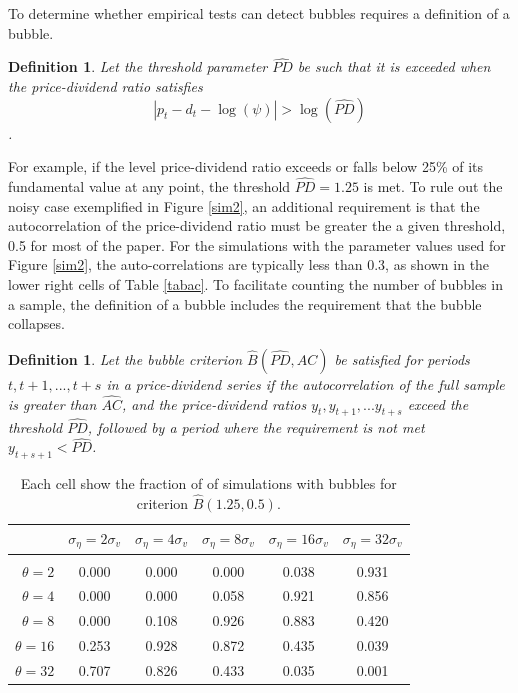 \documentclass[12pt]{article}
\newtheorem{definition}[theorem]{Definition}
\begin{document}
To determine whether empirical tests can detect bubbles requires a definition of a bubble. 
\begin{definition}
Let the threshold parameter $\widehat{PD}$ be such that it is exceeded when the price-dividend ratio satisfies
\begin{equation*}
 \left|p_{t}-d_{t}-\log(\psi)\right|>\log\left(\widehat{PD}\right)   
\end{equation*}.
\end{definition}
For example, if the level price-dividend ratio exceeds or falls below 25\% of its fundamental value at any point, the threshold $\widehat{PD}=1.25$ is met. 
To rule out the noisy case exemplified in Figure \ref{sim2}, an additional requirement is that the autocorrelation of the price-dividend ratio must be greater the a given threshold, 0.5 for most of the paper. For the simulations with the parameter values used for Figure \ref{sim2}, the auto-correlations are typically less than 0.3, as shown in the lower right cells of Table \ref{tabac}.
To facilitate counting the number of bubbles in a sample, the definition of a bubble includes the requirement that the bubble collapses.
\begin{definition}
    Let the bubble criterion $\widehat{B}\left(\widehat{PD},\widehat{AC}\right)$ be satisfied for periods $t,t+1,...,t+s$ in a price-dividend series if the autocorrelation of the full sample is greater than $\widehat{AC}$, and the price-dividend ratios $y_{t},y_{t+1},...y_{t+s}$ exceed the threshold $\widehat{PD}$, followed by a period where the requirement is not met $y_{t+s+1}<\widehat{PD}$. 
    \label{criterion}
\end{definition}

\begin{table}[h]
    \centering
\begin{tabular}{rccccc}
\hline  
            & \multicolumn{1}{l}{$\sigma_{\eta} =2\sigma_{v}$} & \multicolumn{1}{l}{$\sigma_{\eta} =4\sigma_{v}$} & \multicolumn{1}{l}{$\sigma_{\eta} =8\sigma_{v}$} & \multicolumn{1}{l}{$\sigma_{\eta} =16\sigma_{v}$} & \multicolumn{1}{l}{$\sigma_{\eta} =32\sigma_{v}$} \\ \hline  \vspace{-3mm} \\        
$\theta=2$         & 0.000 & 0.000 & 0.000 & 0.038  & 0.931  \\ \hline
$\theta=4$          & 0.000 & 0.000 & 0.058 & 0.921  & 0.856  \\ \hline
$\theta=8$            & 0.000 & 0.108 & 0.926 & 0.883  & 0.420  \\ \hline
$\theta=16$             & 0.253 & 0.928 & 0.872 & 0.435  & 0.039  \\ \hline
$\theta=32$              & 0.707 & 0.826 & 0.433 & 0.035  & 0.001  \\ \hline
\end{tabular}
\caption{Each cell show the fraction of of simulations with bubbles for criterion $\widehat{B}(1.25,0.5)$.}
\label{bub25ac5}
\end{table}
\end{document}
